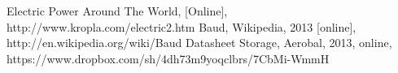 \begin{thebibliography}{99}
	
		Electric Power Around The World, [Online], http://www.kropla.com/electric2.htm
			Baud, Wikipedia, 2013 [online], http://en.wikipedia.org/wiki/Baud
			Datasheet Storage, Aerobal, 2013, online, https://www.dropbox.com/sh/4dh73m9yoqclbrs/7CbMi-WmmH
\end{thebibliography}